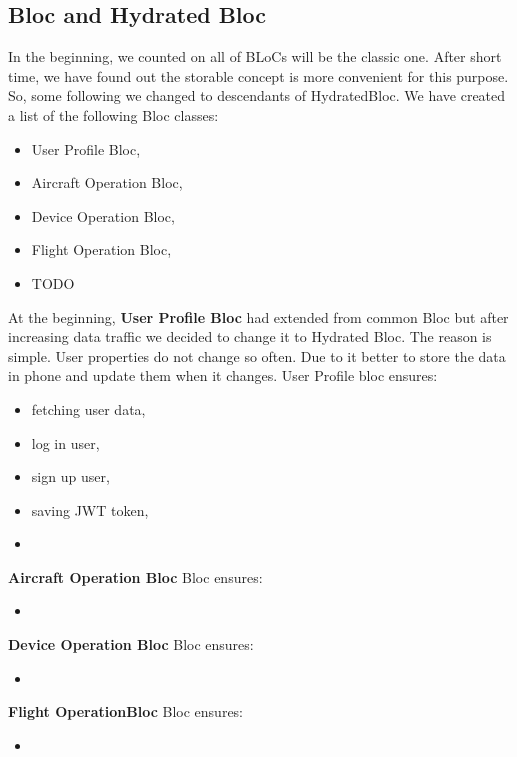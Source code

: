 \subsection{Bloc and Hydrated Bloc}\label{subsec:bloc-and-hydrated-bloc}
In the beginning, we counted on all of BLoCs will be the classic one.
After short time, we have found out the storable concept is more convenient for this purpose.
So, some following we changed to descendants of HydratedBloc.
We have created a list of the following Bloc classes:
\begin{itemize}
    \item User Profile Bloc,
    \item Aircraft Operation Bloc,
    \item Device Operation Bloc,
    \item Flight Operation Bloc,
    \item TODO
\end{itemize}

At the beginning, \textbf{User Profile Bloc} had extended from common Bloc but after increasing data traffic we decided to change it to Hydrated Bloc.
The reason is simple.
User properties do not change so often.
Due to it better to store the data in phone and update them when it changes.
User Profile bloc ensures:
\begin{itemize}
    \item fetching user data,
    \item log in user,
    \item sign up user,
    \item saving JWT token,
    \item
\end{itemize}

\textbf{Aircraft Operation Bloc}
Bloc ensures:
\begin{itemize}
    \item
\end{itemize}

\textbf{Device Operation Bloc}
Bloc ensures:
\begin{itemize}
    \item
\end{itemize}

\textbf{Flight OperationBloc}
Bloc ensures:
\begin{itemize}
    \item
\end{itemize}


